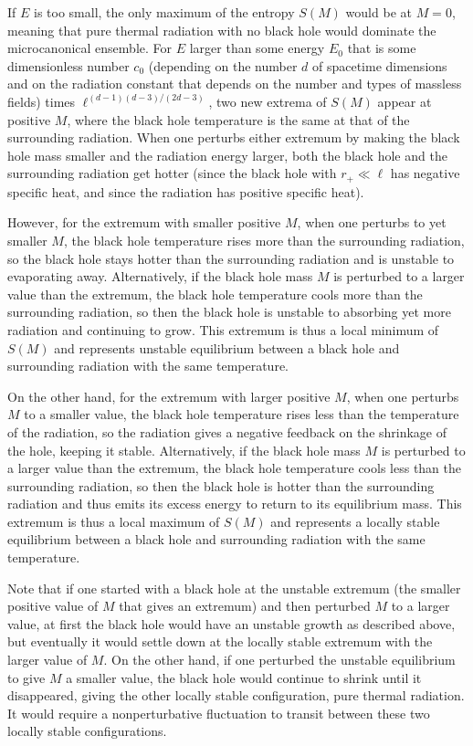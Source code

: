 \documentclass[12pt]{article} \usepackage{latexsym} \textwidth 15cm
\begin{document}
If $E$ is too small, the only maximum of the entropy $S(M)$ would be at
$M=0$, meaning that pure thermal radiation with no black hole would
dominate the microcanonical ensemble.  For $E$ larger than some energy
$E_0$ that is some dimensionless number $c_0$ (depending on the number
$d$ of spacetime dimensions and on the radiation constant that depends
on the number and types of massless fields) times
$\ell^{(d-1)(d-3)/(2d-3)}$, two new extrema of $S(M)$ appear at
positive $M$, where the black hole temperature is the same at that of
the surrounding radiation.  When one perturbs either extremum by making
the black hole mass smaller and the radiation energy larger, both the
black hole and the surrounding radiation get hotter (since the black
hole with $r_+ \ll \ell$ has negative specific heat, and since the
radiation has positive specific heat).

However, for the extremum with smaller positive $M$, when one perturbs
to yet smaller $M$, the black hole temperature rises more than the
surrounding radiation, so the black hole stays hotter than the
surrounding radiation and is unstable to evaporating away. 
Alternatively, if the black hole mass $M$ is perturbed to a larger
value than the extremum, the black hole temperature cools more than the
surrounding radiation, so then the black hole is unstable to absorbing
yet more radiation and continuing to grow.  This extremum is thus a
local minimum of $S(M)$ and represents unstable equilibrium between a
black hole and surrounding radiation with the same temperature.

On the other hand, for the extremum with larger positive $M$, when one
perturbs $M$ to a smaller value, the black hole temperature rises less
than the temperature of the radiation, so the radiation gives a
negative feedback on the shrinkage of the hole, keeping it stable. 
Alternatively, if the black hole mass $M$ is perturbed to a larger
value than the extremum, the black hole temperature cools less than the
surrounding radiation, so then the black hole is hotter than the
surrounding radiation and thus emits its excess energy to return to its
equilibrium mass.  This extremum is thus a local maximum of $S(M)$ and
represents a locally stable equilibrium between a black hole and
surrounding radiation with the same temperature.

Note that if one started with a black hole at the unstable extremum
(the smaller positive value of $M$ that gives an extremum) and then
perturbed $M$ to a larger value, at first the black hole would have an
unstable growth as described above, but eventually it would settle down
at the locally stable extremum with the larger value of $M$.  On the
other hand, if one perturbed the unstable equilibrium to give $M$ a
smaller value, the black hole would continue to shrink until it
disappeared, giving the other locally stable configuration, pure
thermal radiation.  It would require a nonperturbative fluctuation to
transit between these two locally stable configurations.
\end{document}
